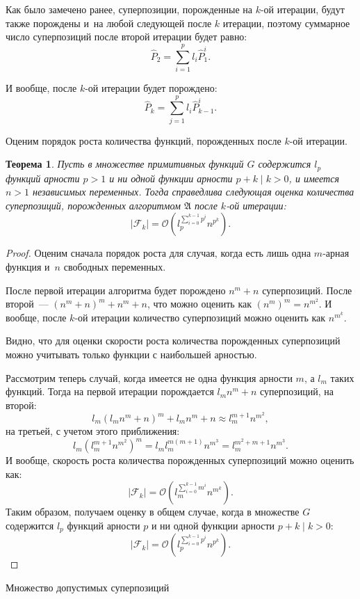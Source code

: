 \documentclass[12pt,a4paper]{article}
\makeatletter
\renewcommand{\section}{\@startsection {section}{1}
  \z@{2.7ex \@plus 1ex}{1.0ex}%
  {\normalfont}}
\newtheorem{theorem}{Теорема}
\makeatother
\begin{document}
Как было замечено ранее, суперпозиции, порожденные на $k$-ой итерации, будут
также порождены и~на любой следующей после $k$ итерации, поэтому суммарное
число суперпозиций после второй итерации будет равно:
\[
\hat{P}_2 = \sum_{i=1}^p l_i \hat{P}_1^i.
\]

И вообще, после $k$-ой итерации будет порождено:
\[
\hat{P}_k = \sum_{j=1}^p l_i \hat{P}_{k-1}^i.
\]

Оценим порядок роста количества функций, порожденных после $k$-ой итерации.

\begin{theorem}
  Пусть в множестве примитивных функций $G$ содержится $l_p$ функций арности
  $p > 1$ и ни одной функции арности $p + k \mid k > 0$, и имеется $n > 1$
  независимых переменных. Тогда справедлива следующая оценка количества
  суперпозиций, порожденных алгоритмом $\mathfrak{A}$ после $k$-ой итерации:
  \[
  | \mathcal{F}_k | = \mathcal{O} (l_p^{\sum_{i=0}^{k-1} p^i} n^{p^k}).
  \]
\end{theorem}
\begin{proof}
  Оценим сначала порядок роста для случая, когда есть лишь одна $m$-арная
  функция и~$n$ свободных переменных.

  После первой итерации алгоритма будет порождено $n^m + n$ суперпозиций.
  После второй~--- $(n^m + n)^m + n^m + n$, что можно оценить как 
  $(n^m)^m = n^{m^2}$. И вообще, после $k$-ой итерации количество
  суперпозиций можно оценить как $n^{m^k}$.

  Видно, что для оценки скорости роста количества порожденных суперпозиций
  можно учитывать только функции с наибольшей арностью.

  Рассмотрим теперь случай, когда имеется не одна функция арности $m$, а
  $l_m$ таких функций. Тогда на первой итерации порождается $l_m n^m + n$
  суперпозиций, на второй:
  \[
  l_m (l_m n^m + n)^m + l_m n^m + n \approx l_m^{m+1} n^{m^2},
  \]
  на третьей, с учетом этого приближения:
  \[
  l_m (l_m^{m+1} n^{m^2})^m = l_m l_m^{m(m+1)} n^{m^3} = l_m^{m^2 + m + 1} n^{m^3}.
  \]
  И вообще, скорость роста количества порожденных суперпозиций можно оценить
  как:
  \[
  | \mathcal{F}_k | = \mathcal{O} (l_m^{\sum_{i=0}^{k-1} m^i} n^{m^k}).
  \]
  Таким образом, получаем оценку в общем случае, когда в множестве $G$ содержится
  $l_p$ функций арности $p$ и ни одной функции арности $p + k \mid k > 0$:
  \[
  | \mathcal{F}_k | = \mathcal{O} (l_p^{\sum_{i=0}^{k-1} p^i} n^{p^k}).
  \]
\end{proof}

\section{Множество допустимых суперпозиций}
\end{document}
